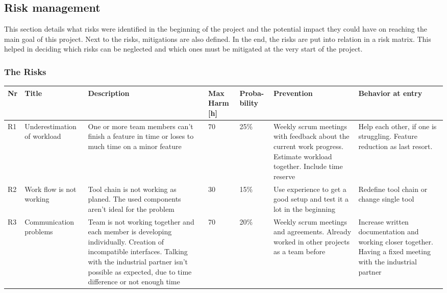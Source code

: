 \subsection{Risk management}
This section details what risks were identified in the beginning of the project and the potential impact they could have on reaching the main goal of this project. Next to the risks, mitigations are also defined. In the end, the risks are put into relation in a risk matrix. This helped in deciding which risks can be neglected and which ones must be mitigated at the very start of the project. 
\subsubsection{The Risks}
\begin{landscape}
	\begin{longtable}[H]
		{l|p{}| p{} | p{} | p{} | p{} | p{}}
		
		\textbf{Nr} & \textbf{Title} & \textbf{Description} & 
		\textbf{Max Harm [h]} & \textbf{Proba- bility} & \textbf{Prevention} &  
		\textbf{Behavior at entry}\\ \hline
		
		R1 & Underestimation of workload & One or more team members can't finish a feature in time or loses to much time on a minor feature & 70 & 25\% & Weekly scrum meetings with feedback about the current work progress. Estimate workload together. Include time reserve & Help each other, if one is struggling. Feature reduction as last resort. \\ 
		
		R2 & Work flow is not working & Tool chain is not working as planed. The used components aren't ideal for the problem & 30 & 15\% & Use experience to get a good setup and test it a lot in the beginning & Redefine tool chain or change single tool \\ 
		
		R3 & Communication problems & Team is not working together and each member is developing individually. Creation of incompatible interfaces. Talking with the industrial partner isn't possible as expected, due to time difference or not enough time & 70 & 20\% & Weekly scrum meetings and agreements. Already worked in other projects as a team before & Increase written documentation and working closer together. Having a fixed meeting with the industrial partner \\ 
		

\end{longtable}
\end{landscape}
